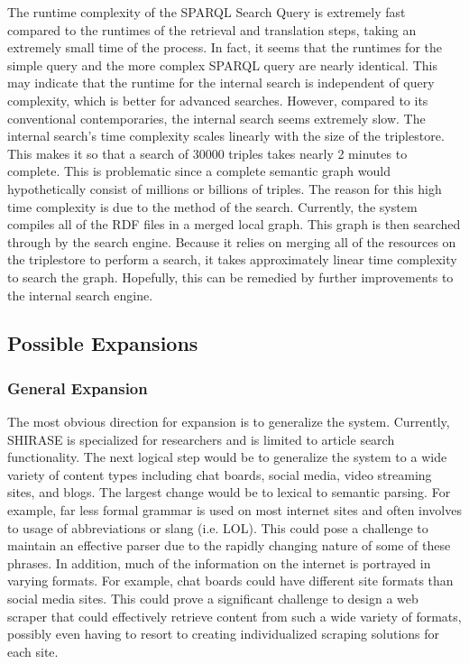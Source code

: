 \documentclass[12pt]{article}
\begin{document}
    The runtime complexity of the SPARQL Search Query is extremely fast compared to the runtimes of the retrieval and translation steps, taking an extremely small time of the process. In fact, it seems that the runtimes for the simple query and the more complex SPARQL query are nearly identical. This may indicate that the runtime for the internal search is independent of query complexity, which is better for advanced searches. However, compared to its conventional contemporaries, the internal search seems extremely slow. The internal search's time complexity scales linearly with the size of the triplestore. This makes it so that a search of 30000 triples takes nearly 2 minutes to complete. This is problematic since a complete semantic graph would hypothetically consist of millions or billions of triples. The reason for this high time complexity is due to the method of the search. Currently, the system compiles all of the RDF files in a merged local graph. This graph is then searched through by the search engine. Because it relies on merging all of the resources on the triplestore to perform a search, it takes approximately linear time complexity to search the graph. Hopefully, this can be remedied by further improvements to the internal search engine.
	\subsection{Possible Expansions}
	\subsubsection{General Expansion}
	\quad The most obvious direction for expansion is to generalize the system. Currently, SHIRASE is specialized for researchers and is limited to article search functionality. The next logical step would be to generalize the system to a wide variety of content types including chat boards, social media, video streaming sites, and blogs. The largest change would be to lexical to semantic parsing. For example, far less formal grammar is used on most internet sites and often involves to usage of abbreviations or slang (i.e. LOL). This could pose a challenge to maintain an effective parser due to the rapidly changing nature of some of these phrases. In addition, much of the information on the internet is portrayed in varying formats. For example, chat boards could have different site formats than social media sites. This could prove a significant challenge to design a web scraper that could effectively retrieve content from such a wide variety of formats, possibly even having to resort to creating individualized scraping solutions for each site.
\end{document}
